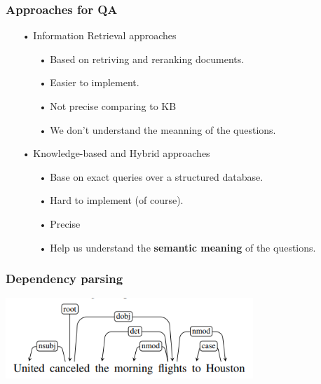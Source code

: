 \documentclass{beamer}
\begin{document}
\begin{frame}
	\frametitle{Approaches for QA}		

			
	\begin{itemize}
		\item[•] Information Retrieval approaches
			\begin{itemize}
			    \item[•] Based on retriving and reranking documents.
				\item[•] Easier to implement.
				\item[•] Not precise comparing to KB
				\item[•] We don't understand the meanning of the questions.
			\end{itemize}
		
		\item[•] Knowledge-based and Hybrid approaches
			\begin{itemize}
			\item[•] Base on exact queries over a structured database.
			\item[•] Hard to implement (of course).
			\item[•] Precise
			\item[•] Help us understand the \textbf{semantic meaning} of the questions. 
			\end{itemize}
	\end{itemize}		
		
			
\end{frame}


\begin{frame}
	\frametitle{Dependency parsing}
			
	\begin{center} 
		\centering 
			\includegraphics[width=0.7\textwidth,height=0.7\textheight,keepaspectratio]{example} 			
			\vspace{0.5cm} 
	\end{center}		
		
\end{frame}
\end{document}
